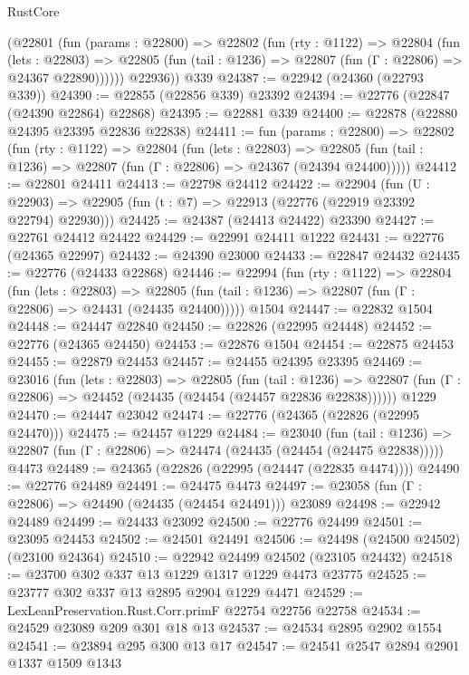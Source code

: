 \begin{lexlean}{RustCore}
\begin{coremodule}
        (@22801
          (fun (params : @22800) =>
          @22802
            (fun (rty : @1122) =>
            @22804
              (fun (lets : @22803) =>
              @22805 (fun (tail : @1236) => @22807 (fun (Γ : @22806) => @24367 @22890))))))
        @22936))
    @339
@24387 := @22942 (@24360 (@22793 @339))
@24390 := @22855 (@22856 @339) @23392
@24394 := @22776 (@22847 (@24390 @22864) @22868)
@24395 := @22881 @339
@24400 := @22878 (@22880 @24395 @23395 @22836 @22838)
@24411 := fun (params : @22800) =>
  @22802
    (fun (rty : @1122) =>
    @22804
      (fun (lets : @22803) =>
      @22805 (fun (tail : @1236) => @22807 (fun (Γ : @22806) => @24367 (@24394 @24400)))))
@24412 := @22801 @24411
@24413 := @22798 @24412
@24422 := @22904
    (fun (U : @22903) => @22905 (fun (t : @7) => @22913 (@22776 (@22919 @23392 @22794) @22930)))
@24425 := @24387 (@24413 @24422) @23390
@24427 := @22761 @24412 @24422
@24429 := @22991 @24411 @1222
@24431 := @22776 (@24365 @22997)
@24432 := @24390 @23000
@24433 := @22847 @24432
@24435 := @22776 (@24433 @22868)
@24446 := @22994
    (fun (rty : @1122) =>
    @22804
      (fun (lets : @22803) =>
      @22805 (fun (tail : @1236) => @22807 (fun (Γ : @22806) => @24431 (@24435 @24400)))))
    @1504
@24447 := @22832 @1504
@24448 := @24447 @22840
@24450 := @22826 (@22995 @24448)
@24452 := @22776 (@24365 @24450)
@24453 := @22876 @1504
@24454 := @22875 @24453
@24455 := @22879 @24453
@24457 := @24455 @24395 @23395
@24469 := @23016
    (fun (lets : @22803) =>
    @22805
      (fun (tail : @1236) =>
      @22807 (fun (Γ : @22806) => @24452 (@24435 (@24454 (@24457 @22836 @22838))))))
    @1229
@24470 := @24447 @23042
@24474 := @22776 (@24365 (@22826 (@22995 @24470)))
@24475 := @24457 @1229
@24484 := @23040
    (fun (tail : @1236) => @22807 (fun (Γ : @22806) => @24474 (@24435 (@24454 (@24475 @22838)))))
    @4473
@24489 := @24365 (@22826 (@22995 (@24447 (@22835 @4474))))
@24490 := @22776 @24489
@24491 := @24475 @4473
@24497 := @23058 (fun (Γ : @22806) => @24490 (@24435 (@24454 @24491))) @23089
@24498 := @22942 @24489
@24499 := @24433 @23092
@24500 := @22776 @24499
@24501 := @23095 @24453
@24502 := @24501 @24491
@24506 := @24498 (@24500 @24502) (@23100 @24364)
@24510 := @22942 @24499 @24502 (@23105 @24432)
@24518 := @23700 @302 @337 @13 @1229 @1317 @1229 @4473 @23775
@24525 := @23777 @302 @337 @13 @2895 @2904 @1229 @4471
@24529 := LexLeanPreservation.Rust.Corr.primF @22754 @22756 @22758
@24534 := @24529 @23089 @209 @301 @18 @13
@24537 := @24534 @2895 @2902 @1554
@24541 := @23894 @295 @300 @13 @17
@24547 := @24541 @2547 @2894 @2901 @1337 @1509 @1343

\end{coremodule}
\end{lexlean}
